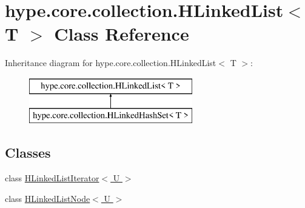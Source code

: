 \hypertarget{classhype_1_1core_1_1collection_1_1_h_linked_list_3_01_t_01_4}{\section{hype.\-core.\-collection.\-H\-Linked\-List$<$ T $>$ Class Reference}
\label{classhype_1_1core_1_1collection_1_1_h_linked_list_3_01_t_01_4}
}
Inheritance diagram for hype.\-core.\-collection.\-H\-Linked\-List$<$ T $>$\-:\begin{figure}[H]
\begin{center}
\leavevmode
\includegraphics[height=2.000000cm]{classhype_1_1core_1_1collection_1_1_h_linked_list_3_01_t_01_4}
\end{center}
\end{figure}
\subsection*{Classes}
\begin{DoxyCompactItemize}
\item 
class \hyperlink{classhype_1_1core_1_1collection_1_1_h_linked_list_3_01_t_01_4_1_1_h_linked_list_iterator_3_01_u_01_4}{H\-Linked\-List\-Iterator$<$ U $>$}
\item 
class \hyperlink{classhype_1_1core_1_1collection_1_1_h_linked_list_3_01_t_01_4_1_1_h_linked_list_node_3_01_u_01_4}{H\-Linked\-List\-Node$<$ U $>$}
\end{DoxyCompactItemize}
